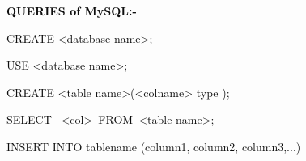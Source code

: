 \documentclass[12pt]{report}
\renewcommand{\_}{\kern-1.5pt\textunderscore\kern-1.5pt}
\begin{document}
\vspace{\baselineskip}
\begin{adjustwidth}{0.3in}{0.84in}
\begin{justify}
\textbf{\textcolor[HTML]{0D0D0D}{QUERIES of MySQL:-}}
\end{justify}\par

\end{adjustwidth}


\vspace{\baselineskip}
\begin{adjustwidth}{0.3in}{0.84in}
\begin{justify}
\textcolor[HTML]{0D0D0D}{CREATE <database name>;}
\end{justify}\par

\end{adjustwidth}

\begin{adjustwidth}{0.3in}{0.84in}
\begin{justify}
\textcolor[HTML]{0D0D0D}{USE <database name>;}
\end{justify}\par

\end{adjustwidth}

\begin{adjustwidth}{0.3in}{0.84in}
\begin{justify}
\textcolor[HTML]{0D0D0D}{CREATE <table name>(<col\_name> type );}
\end{justify}\par

\end{adjustwidth}

\begin{adjustwidth}{0.3in}{0.84in}
\begin{justify}
\textcolor[HTML]{0D0D0D}{SELECT  <col> FROM <table name>;}
\end{justify}\par

\end{adjustwidth}


\vspace{\baselineskip}
\begin{adjustwidth}{0.3in}{0.84in}
\begin{justify}
\textcolor[HTML]{0D0D0D}{INSERT INTO table\_name (column1, column2, column3,...)}
\end{justify}\par

\end{adjustwidth}
\end{document}
